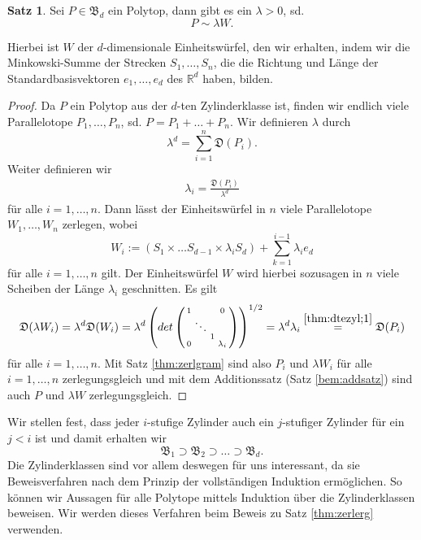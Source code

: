 \documentclass[11pt,titlepage]{article}
\newcommand{\setR}{\mathbb{R}}
\theoremstyle{definition}
\newtheorem{theorem}{Satz}[section]
\theoremstyle{remark}
\begin{document}
	\begin{theorem} \label{bem:dteZylinderklasse}
		Sei $P\in\mathfrak{B}_d$ ein Polytop, dann gibt es ein $\lambda>0$, sd. 
		\[P\sim \lambda W.\] 
	\end{theorem}
	
	Hierbei ist $W$ der $d$-dimensionale Einheitswürfel, den wir erhalten, 
	indem wir die Minkowski-Summe der Strecken $S_1,\ldots,S_n$, 
	die die Richtung und Länge der Standardbasisvektoren $e_1,\ldots, e_d$ 
	des $\setR^d$ haben, bilden.
	
	\begin{proof}
		Da $P$ ein Polytop aus der $d$-ten Zylinderklasse ist, finden 
		wir endlich viele Parallelotope $P_1,\ldots, P_n$, sd. 
		$P=P_1+\ldots+P_n$. Wir definieren $\lambda$ durch 
		\[\lambda^d =\sum_{i=1}^n \mathfrak{D}(P_i).\]
		Weiter definieren wir 
		\begin{align}
			\lambda_i =\frac{\mathfrak{D}(P_i)}{\lambda^d} \label{thm:dtezyl;1}
		\end{align}
		für alle $i=1,\ldots,n$. Dann lässt der Einheitswürfel in $n$ viele 
		Parallelotope $W_1,\ldots,W_n$ zerlegen, wobei
		\[W_i:=(S_1\times\ldots S_{d-1}\times \lambda_i S_d)+
		\sum_{k=1}^{i-1} \lambda_i e_d\]
		für alle $i=1,\ldots,n$ gilt. Der Einheitswürfel $W$ wird hierbei 
		sozusagen in $n$ viele Scheiben der Länge $\lambda_i$ geschnitten. 
		Es gilt 
		\[\mathfrak{D}(\lambda W_i)=\lambda^d \mathfrak{D}(W_i)=
		\lambda^d \left(det \left(\begin{smallmatrix}
		1 & \ &\ &0 \\
		\ &\ddots &\ &\ \\
		\ & \ &  1 &\ \\
		0 & \ & \ & \lambda_i
		\end{smallmatrix}\right)\right)^{1/2}=\lambda^d \lambda_i\overset{\ref{thm:dtezyl;1}}{=}\mathfrak{D}(P_i)\]
		für alle $i=1,\ldots,n$. Mit Satz \ref{thm:zerlgram} 
		sind also $P_i$ und $\lambda W_i$ für alle $i=1,\ldots,n$ zerlegungsgleich 
		und mit dem Additionssatz (Satz \ref{bem:addsatz}) 
		sind auch $P$ und $\lambda W$ zerlegungsgleich.
	\end{proof}
	
	Wir stellen fest, dass jeder $i$-stufige Zylinder auch ein $j$-stufiger 
	Zylinder für ein $j<i$ ist und damit erhalten wir
	\[\mathfrak{B}_1\supset \mathfrak{B}_2\supset \ldots\supset\mathfrak{B}_d.\]
	Die Zylinderklassen sind vor allem deswegen für uns interessant, da sie 
	Beweisverfahren nach dem Prinzip der vollständigen Induktion ermöglichen. 
	So können wir Aussagen für alle Polytope mittels Induktion über die 
	Zylinderklassen beweisen. Wir werden dieses Verfahren beim Beweis zu Satz 
	\ref{thm:zerlerg} verwenden. 
	
\end{document}
